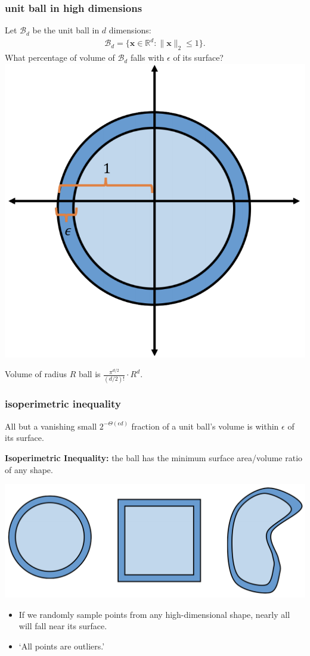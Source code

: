 \documentclass[compress]{beamer}
\newcommand{\bv}[1]{\mathbf{#1}}
\newcommand{\R}{\mathbb{R}}
\begin{document}
\begin{frame}[t]
	\frametitle{unit ball in high dimensions}
	Let $\mathcal{B}_d$ be the unit ball in $d$ dimensions: \begin{align*}\mathcal{B}_d = \{\bv{x}\in \R^d: \|\bv{x}\|_2 \leq 1\}.\end{align*}
	\alert{What percentage of volume of $\mathcal{B}_d$ falls with $\epsilon$ of its surface?}
		\includegraphics[width=.4\textwidth]{unitBall.png}
		
	Volume of radius $R$ ball is $\frac{\pi^{d/2}}{(d/2)!}\cdot R^d$. 
\end{frame}

\begin{frame}[t]
	\frametitle{isoperimetric inequality}
	All but a vanishing small $2^{-\Theta(\epsilon d)}$ fraction of a unit ball's volume is within $\epsilon$ of its surface.
	
	\textbf{Isoperimetric Inequality:} the ball has the minimum surface
	area/volume ratio of any shape.
	\begin{center}
	\includegraphics[width=.7\textwidth]{isoperimetry.png}
	\end{center}
	\begin{itemize}
	\item If we randomly sample points from any high-dimensional shape,
	nearly all will fall near its surface.
	\item  ‘All points are outliers.’ 
	\end{itemize}
\end{frame}
\end{document}

